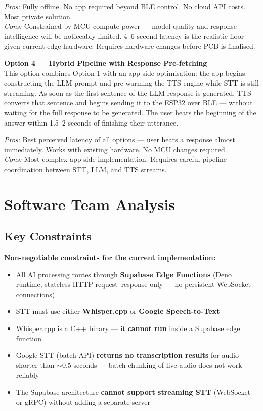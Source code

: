 \documentclass[12pt,a4paper]{article}
\begin{document}
\begin{hwbox}
\textit{Pros:} Fully offline. No app required beyond BLE control. No cloud API costs. Most
private solution.\\
\textit{Cons:} Constrained by MCU compute power — model quality and response intelligence will
be noticeably limited. 4--6 second latency is the realistic floor given current edge hardware.
Requires hardware changes before PCB is finalised.

\bigskip
\textbf{Option 4 — Hybrid Pipeline with Response Pre-fetching}\\
This option combines Option 1 with an app-side optimisation: the app begins constructing the
LLM prompt and pre-warming the TTS engine while STT is still streaming. As soon as the first
sentence of the LLM response is generated, TTS converts that sentence and begins sending it to
the ESP32 over BLE — without waiting for the full response to be generated. The user hears the
beginning of the answer within 1.5--2 seconds of finishing their utterance.

\textit{Pros:} Best perceived latency of all options — user hears a response almost immediately.
Works with existing hardware. No MCU changes required.\\
\textit{Cons:} Most complex app-side implementation. Requires careful pipeline coordination
between STT, LLM, and TTS streams.
\end{hwbox}

\section{Software Team Analysis}

\subsection{Key Constraints}

\begin{constraintbox}
\textbf{Non-negotiable constraints for the current implementation:}
\begin{itemize}[leftmargin=1.5em]
  \item All AI processing routes through \textbf{Supabase Edge Functions} (Deno runtime,
        stateless HTTP request--response only — no persistent WebSocket connections)
  \item STT must use either \textbf{Whisper.cpp} or \textbf{Google Speech-to-Text}
  \item Whisper.cpp is a C++ binary — it \textbf{cannot run} inside a Supabase edge function
  \item Google STT (batch API) \textbf{returns no transcription results} for audio shorter
        than $\sim$0.5 seconds — batch chunking of live audio does not work reliably
  \item The Supabase architecture \textbf{cannot support streaming STT} (WebSocket or gRPC)
        without adding a separate server
\end{itemize}
\end{constraintbox}
\end{document}
